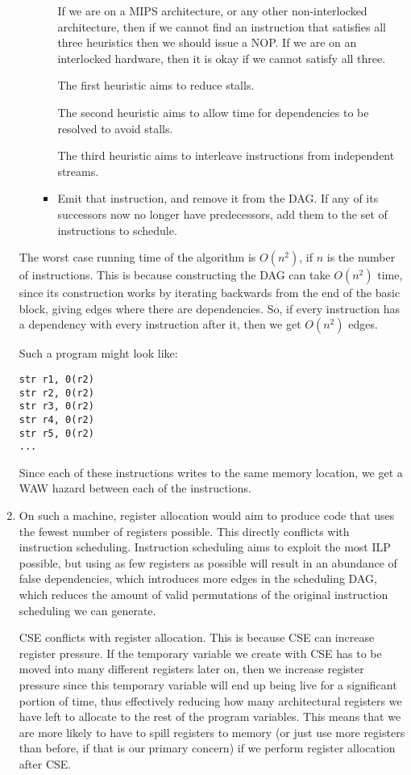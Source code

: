 \begin{enumerate}[label=(\alph*)]
\begin{itemize}
\begin{itemize}
                    If we are on a MIPS architecture, or any other non-interlocked architecture, then if we cannot find an instruction that satisfies all three heuristics then we should issue a NOP. If we are on an interlocked hardware, then it is okay if we cannot satisfy all three.

                    The first heuristic aims to reduce stalls.

                    The second heuristic aims to allow time for dependencies to be resolved to avoid stalls.

                    The third heuristic aims to interleave instructions from independent streams.

                    \item
                      Emit that instruction, and remove it from the DAG. If any of its successors now no longer have predecessors, add them to the set of instructions to schedule.
              \end{itemize}
    \end{itemize}


    The worst case running time of the algorithm is $O(n^2)$, if $n$ is the number of instructions. This is because constructing the DAG can take $O(n^2)$ time, since its construction works by iterating backwards from the end of the basic block, giving edges where there are dependencies. So, if every instruction has a dependency with every instruction after it, then we get $O(n^2)$ edges.

    Such a program might look like:

\begin{verbatim}
str r1, 0(r2)
str r2, 0(r2)
str r3, 0(r2)
str r4, 0(r2)
str r5, 0(r2)
...
\end{verbatim}

Since each of these instructions writes to the same memory location, we get a WAW hazard between each of the instructions.

\item
  On such a machine, register allocation would aim to produce code that uses the fewest number of registers possible. This directly conflicts with instruction scheduling. Instruction scheduling aims to exploit the most ILP possible, but using as few registers as possible will result in an abundance of false dependencies, which introduces more edges in the scheduling DAG, which reduces the amount of valid permutations of the original instruction scheduling we can generate.

  CSE conflicts with register allocation. This is because CSE can increase register pressure. If the temporary variable we create with CSE has to be moved into many different registers later on, then we increase register pressure since this temporary variable will end up being live for a significant portion of time, thus effectively reducing how many architectural registers we have left to allocate to the rest of the program variables. This means that we are more likely to have to spill registers to memory (or just use more registers than before, if that is our primary concern) if we perform register allocation after CSE.


\end{enumerate}
